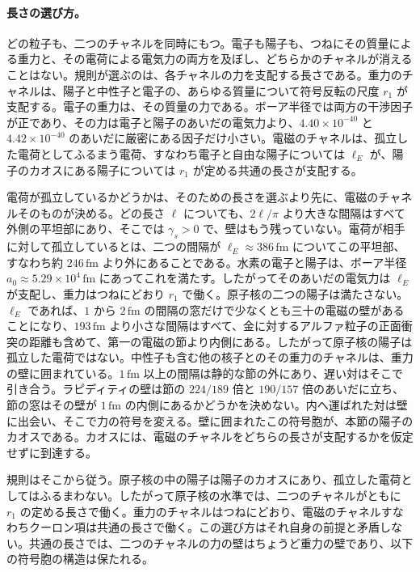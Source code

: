 \documentclass[a4paper]{article}
\begin{document}
\paragraph{長さの選び方。}\label{rule:length}
どの粒子も、二つのチャネルを同時にもつ。電子も陽子も、つねにその質量による重力と、その電荷による電気力の両方を及ぼし、どちらかのチャネルが消えることはない。規則が選ぶのは、各チャネルの力を支配する長さである。重力のチャネルは、陽子と中性子と電子の、あらゆる質量について符号反転の尺度 \(r_1\) が支配する。電子の重力は、その質量の力である。ボーア半径では両方の干渉因子が正であり、その力は電子と陽子のあいだの電気力より、\(4.40\times 10^{-40}\) と \(4.42\times 10^{-40}\) のあいだに厳密にある因子だけ小さい。電磁のチャネルは、孤立した電荷としてふるまう電荷、すなわち電子と自由な陽子については \(\ell_E\) が、陽子のカオスにある陽子については \(r_1\) が定める共通の長さが支配する。

電荷が孤立しているかどうかは、そのための長さを選ぶより先に、電磁のチャネルそのものが決める。どの長さ \(\ell\) についても、\(2\ell/\pi\) より大きな間隔はすべて外側の平坦部にあり、そこでは \(\gamma_s>0\) で、壁はもう残っていない。電荷が相手に対して孤立しているとは、二つの間隔が \(\ell_E\approx 386\,\mathrm{fm}\) についてこの平坦部、すなわち約 \(246\,\mathrm{fm}\) より外にあることである。水素の電子と陽子は、ボーア半径 \(a_0\approx 5.29\times 10^{4}\,\mathrm{fm}\) にあってこれを満たす。したがってそのあいだの電気力は \(\ell_E\) が支配し、重力はつねにどおり \(r_1\) で働く。原子核の二つの陽子は満たさない。\(\ell_E\) であれば、\(1\) から \(2\,\mathrm{fm}\) の間隔の窓だけで少なくとも三十の電磁の壁があることになり、\(193\,\mathrm{fm}\) より小さな間隔はすべて、金に対するアルファ粒子の正面衝突の距離も含めて、第一の電磁の節より内側にある。したがって原子核の陽子は孤立した電荷ではない。中性子も含む他の核子とのその重力のチャネルは、重力の壁に囲まれている。\(1\,\mathrm{fm}\) 以上の間隔は静的な節の外にあり、遅い対はそこで引き合う。ラピディティの壁は節の \(224/189\) 倍と \(190/157\) 倍のあいだに立ち、節の窓はその壁が \(1\,\mathrm{fm}\) の内側にあるかどうかを決めない。内へ運ばれた対は壁に出会い、そこで力の符号を変える。壁に囲まれたこの符号胞が、本節の陽子のカオスである。カオスには、電磁のチャネルをどちらの長さが支配するかを仮定せずに到達する。

規則はそこから従う。原子核の中の陽子は陽子のカオスにあり、孤立した電荷としてはふるまわない。したがって原子核の水準では、二つのチャネルがともに \(r_1\) の定める長さで働く。重力のチャネルはつねにどおり、電磁のチャネルすなわちクーロン項は共通の長さで働く。この選び方はそれ自身の前提と矛盾しない。共通の長さでは、二つのチャネルの力の壁はちょうど重力の壁であり、以下の符号胞の構造は保たれる。
\end{document}
